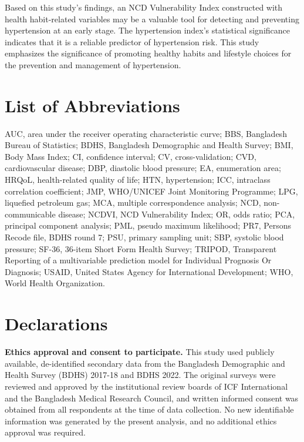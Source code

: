\documentclass[
  12pt,
  a4paper]{article}
\begin{document}
Based on this study's findings, an NCD Vulnerability Index constructed with health habit-related variables may be a valuable tool for detecting and preventing hypertension at an early stage. The hypertension index's statistical significance indicates that it is a reliable predictor of hypertension risk. This study emphasizes the significance of promoting healthy habits and lifestyle choices for the prevention and management of hypertension.

\section*{List of Abbreviations}\label{list-of-abbreviations}

AUC, area under the receiver operating characteristic curve; BBS, Bangladesh Bureau of Statistics; BDHS, Bangladesh Demographic and Health Survey; BMI, Body Mass Index; CI, confidence interval; CV, cross-validation; CVD, cardiovascular disease; DBP, diastolic blood pressure; EA, enumeration area; HRQoL, health-related quality of life; HTN, hypertension; ICC, intraclass correlation coefficient; JMP, WHO/UNICEF Joint Monitoring Programme; LPG, liquefied petroleum gas; MCA, multiple correspondence analysis; NCD, non-communicable disease; NCDVI, NCD Vulnerability Index; OR, odds ratio; PCA, principal component analysis; PML, pseudo maximum likelihood; PR7, Persons Recode file, BDHS round 7; PSU, primary sampling unit; SBP, systolic blood pressure; SF-36, 36-item Short Form Health Survey; TRIPOD, Transparent Reporting of a multivariable prediction model for Individual Prognosis Or Diagnosis; USAID, United States Agency for International Development; WHO, World Health Organization.

\section*{Declarations}\label{declarations}

\textbf{Ethics approval and consent to participate.} This study used publicly available, de-identified secondary data from the Bangladesh Demographic and Health Survey (BDHS) 2017-18 and BDHS 2022. The original surveys were reviewed and approved by the institutional review boards of ICF International and the Bangladesh Medical Research Council, and written informed consent was obtained from all respondents at the time of data collection. No new identifiable information was generated by the present analysis, and no additional ethics approval was required.
\end{document}
